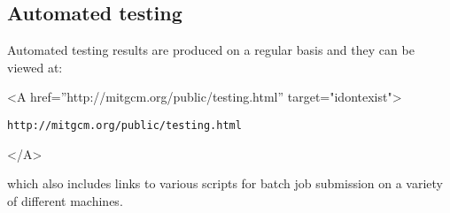 \subsection{Automated testing}

Automated testing results are produced on a regular basis and they can
be viewed at:
\begin{rawhtml} <A href=''http://mitgcm.org/public/testing.html'' target="idontexist"> \end{rawhtml}
\begin{verbatim}
http://mitgcm.org/public/testing.html
\end{verbatim}
\begin{rawhtml} </A> \end{rawhtml}
which also includes links to various scripts for batch job submission
on a variety of different machines.

